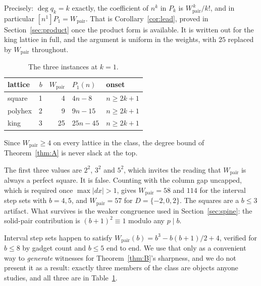 \documentclass[11pt]{article}
\newcommand{\Wp}{W_{\mathrm{pair}}}
\begin{document}
Precisely: $\deg q_k = k$ exactly, the coefficient of $n^k$ in $P_k$ is
$\Wp^{\,k}/k!$, and in particular $[n^1]P_1 = \Wp$. That is
Corollary~\ref{cor:lead}, proved in Section~\ref{sec:product} once the product
form is available. It is written out for the king lattice in full, and the
argument is uniform in the weights, with $25$ replaced by $\Wp$ throughout.

\begin{table}[H]
\centering
\begin{tabular}{l r r l l}
\toprule
lattice & $b$ & $\Wp$ & $P_1(n)$ & onset \\
\midrule
square    & 1 & 4  & $4n-8$   & $n \ge 2k+1$ \\
polyhex   & 2 & 9  & $9n-15$  & $n \ge 2k+1$ \\
king      & 3 & 25 & $25n-45$ & $n \ge 2k+1$ \\
\bottomrule
\end{tabular}
\caption{The three instances at $k=1$.}
\label{tab:instances}
\end{table}

Since $\Wp \ge 4$ on every lattice in the class, the degree bound of
Theorem~\ref{thm:A} is never slack at the top.

\begin{remark}
\label{rem:notsquares}
The first three values are $2^2$, $3^2$ and $5^2$, which invites the reading that
$\Wp$ is always a perfect square. It is false. Counting with the column gap
uncapped, which is required once $\max|dx| > 1$, gives $\Wp = 58$ and $114$ for
the interval step sets with $b = 4, 5$, and $\Wp = 57$ for $D = \{-2,0,2\}$. The
squares are a $b \le 3$ artifact. What survives is the weaker congruence used in
Section~\ref{sec:spine}: the solid-pair contribution is $(b+1)^2 \equiv 1$
modulo any $p \mid b$.

Interval step sets happen to satisfy $\Wp(b) = b^3 - b(b+1)/2 + 4$, verified for
$b \le 8$ by gadget count and $b \le 5$ end to end. We use that only as a
convenient way to \emph{generate} witnesses for Theorem~\ref{thm:B}'s sharpness,
and we do not present it as a result: exactly three members of the class are
objects anyone studies, and all three are in Table~\ref{tab:instances}.
\end{remark}
\end{document}
